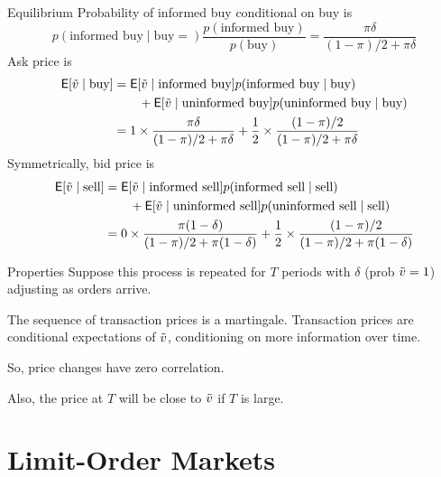 \documentclass[xcolor=dvipsnames,10pt]{beamer}
\begin{document}
\begin{frame}{Equilibrium}
Probability of informed buy conditional on buy is 
$$p(\text{informed buy}\mid \text{buy} = )\frac{p(\text{informed buy})}{p(\text{buy})} = \frac{\pi \delta}{(1-\pi)/2 + \pi\delta} $$
Ask price is
\begin{align*}
\mathsf{E}[\tilde{v} \mid \text{buy}] &= \mathsf{E}[\tilde{v} \mid \text{informed buy}]p(\text{informed buy}\mid \text{buy}) \\ 
    &\qquad + \mathsf{E}[\tilde{v} \mid \text{uninformed buy}]p(\text{uninformed buy}\mid \text{buy}) \\ 
    & = 1 \times \frac{\pi \delta}{(1-\pi)/2 + \pi\delta} + \frac{1}{2} \times \frac{(1-\pi)/2}{(1-\pi)/2 + \pi\delta}
\end{align*}
Symmetrically, bid price is
\begin{align*}
    \mathsf{E}[\tilde{v} \mid \text{sell}] &= \mathsf{E}[\tilde{v} \mid \text{informed sell}]p(\text{informed sell}\mid \text{sell}) \\
    & \qquad + \mathsf{E}[\tilde{v} \mid \text{uninformed sell}]p(\text{uninformed sell}\mid \text{sell}) 
    \\ &= 0 \times \frac{\pi (1-\delta)}{(1-\pi)/2 + \pi(1-\delta)} + \frac{1}{2} \times \frac{(1-\pi)/2}{(1-\pi)/2 + \pi(1-\delta)}
\end{align*}
    \end{frame}
\begin{frame}{Properties}
    Suppose this process is repeated for $T$ periods with $\delta$ (prob $\tilde{v}=1$) adjusting as orders arrive.
    
    The sequence of transaction prices is a martingale.  Transaction prices are conditional expectations of $\tilde{v}$, conditioning on more information over time.
    
    So, price changes have zero correlation.
    
    Also, the price at $T$ will be close to $\tilde{v}$ if $T$ is large.
\end{frame}

\section{Limit-Order Markets}\subsection{}
\end{document}
